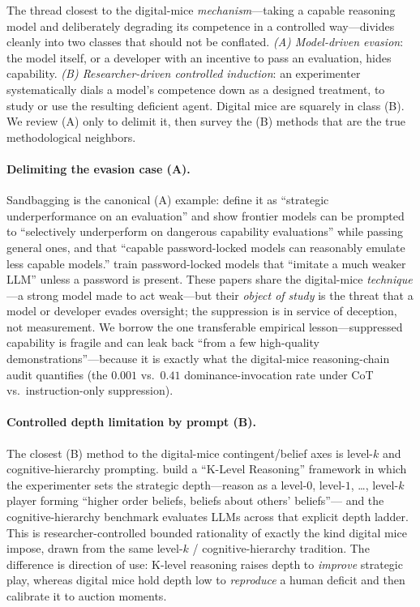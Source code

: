 The thread closest to the digital-mice \emph{mechanism}---taking a
capable reasoning model and deliberately degrading its competence in a
controlled way---divides cleanly into two classes that should not be
conflated. \emph{(A) Model-driven evasion}: the model itself, or a
developer with an incentive to pass an evaluation, hides capability.
\emph{(B) Researcher-driven controlled induction}: an experimenter
systematically dials a model's competence down as a designed treatment,
to study or use the resulting deficient agent. Digital mice are squarely
in class (B). We review (A) only to delimit it, then survey the (B)
methods that are the true methodological neighbors.

\paragraph{Delimiting the evasion case (A).}
Sandbagging is the canonical (A) example: \citet{vanderweij2024sandbagging}
define it as ``strategic underperformance on an evaluation'' and show
frontier models can be prompted to ``selectively underperform on
dangerous capability evaluations'' while passing general ones, and that
``capable password-locked models can reasonably emulate less capable
models.'' \citet{greenblatt2024password} train password-locked models
that ``imitate a much weaker LLM'' unless a password is present. These
papers share the digital-mice \emph{technique}---a strong model made to
act weak---but their \emph{object of study} is the threat that a model
or developer evades oversight; the suppression is in service of
deception, not measurement. We borrow the one transferable empirical
lesson---suppressed capability is fragile and can leak back ``from a few
high-quality demonstrations''---because it is exactly what the
digital-mice reasoning-chain audit quantifies (the $0.001$ vs.\ $0.41$
dominance-invocation rate under CoT vs.\ instruction-only suppression).

\paragraph{Controlled depth limitation by prompt (B).}
The closest (B) method to the digital-mice contingent/belief axes is
level-$k$ and cognitive-hierarchy prompting. \citet{zhang2024klevel}
build a ``K-Level Reasoning'' framework in which the experimenter sets
the strategic depth---reason as a level-$0$, level-$1$, \dots, level-$k$
player forming ``higher order beliefs, beliefs about others' beliefs''---
and the cognitive-hierarchy benchmark \citep{chbench2025} evaluates LLMs
across that explicit depth ladder. This is researcher-controlled
bounded rationality of exactly the kind digital mice impose, drawn from
the same level-$k$ / cognitive-hierarchy tradition. The difference is
direction of use: K-level reasoning raises depth to \emph{improve}
strategic play, whereas digital mice hold depth low to \emph{reproduce}
a human deficit and then calibrate it to auction moments.

